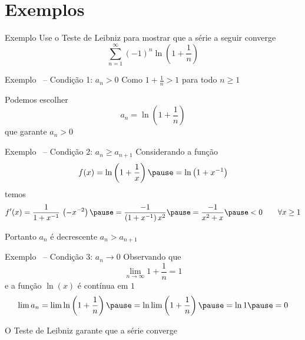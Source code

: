 \section{Exemplos}

\addtocounter{exemplo}{1}
\begin{frame}{Exemplo \theexemplo}
  Use o Teste de Leibniz para mostrar que a série a seguir converge
  \[
    \sum_{n=1}^\infty(-1)^{n}\ln\left(1+\frac{1}{n}\right)
  \]
\end{frame}

\begin{frame}{Exemplo \theexemplo\ -- Condição 1: \(a_n>0\)}
  \pause
  Como
  \(
    1 + \frac{1}{n} > 1
  \)
  para todo $n\geq 1$

  \pause
  \vspace{\baselineskip}
  Podemos escolher
  \[
    a_n = \ln\left(1+\frac{1}{n}\right)
  \]
  que garante $a_n>0$
\end{frame}

\begin{frame}{Exemplo \theexemplo\ -- Condição 2: \(a_n\geq a_{n+1}\)}
  \pause
  Considerando a função
  \[
    f(x)
    = \ln\left(1+\frac{1}{x}\right)
    \pause
    = \ln\left(1+x^{-1}\right)
  \]
  \pause
  temos
  \[
    f'(x)
    = \frac{1}{1+x^{-1}} \, \left(-x^{-2}\right)
    \pause
    = \frac{-1}{\left(1+x^{-1}\right)x^2}
    \pause
    = \frac{-1}{x^2+x}
    \pause
    < 0
    \qquad \forall x\geq 1
  \]

  \pause
  \vspace{0.5\baselineskip}
  Portanto $a_n$ é decrescente \(a_n>a_{n+1}\)
\end{frame}

\begin{frame}{Exemplo \theexemplo\ -- Condição 3: \(a_n\to 0\)}
  \pause
  Observando que
  \[
    \lim_{n\to\infty} 1+\frac{1}{n} = 1
  \]
  \pause
  e a função $\ln(x)$ é contínua em $1$
  \pause
  \[
    \lim a_n
    = \lim \ln \left(1+\frac{1}{n}\right)
    \pause
    = \ln\lim \left(1+\frac{1}{n}\right)
    \pause
    = \ln 1
    \pause
    = 0
  \]

  \pause
  O Teste de Leibniz garante que a série converge
\end{frame}

